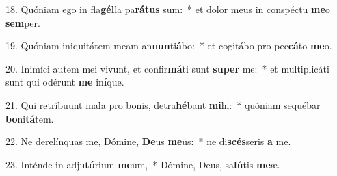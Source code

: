 18. Quóniam ego in fla\textbf{gél}la pa\textbf{rá}\textbf{tus} sum:~*  et dolor meus in conspéctu \textbf{me}o \textbf{sem}per.\

19. Quóniam iniquitátem meam an\textbf{nun}ti\textbf{á}bo:~*  et cogitábo pro pec\textbf{cá}to \textbf{me}o.\

20. Inimíci autem mei vivunt, et confir\textbf{má}ti sunt \textbf{su}\textbf{per} me:~*  et multiplicáti sunt qui odérunt \textbf{me} in\textbf{í}que.\

21. Qui retríbuunt mala pro bonis, detra\textbf{hé}bant \textbf{mi}hi:~*  quóniam sequébar \textbf{bo}ni\textbf{tá}tem.\

22. Ne derelínquas me, Dómine, \textbf{De}us \textbf{me}us:~*  ne di\textbf{scés}seris \textbf{a} me.\

23. Inténde in adju\textbf{tó}rium \textbf{me}um,~*  Dómine, Deus, sa\textbf{lú}tis \textbf{me}æ.\

